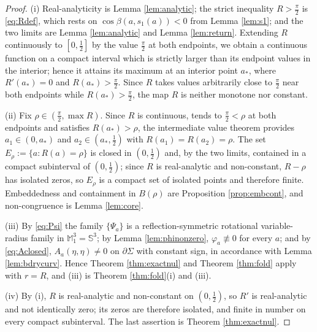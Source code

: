 \documentclass[11pt,a4paper]{amsart}
\theoremstyle{plain}
\theoremstyle{definition}
\newcommand{\M}{\mathbb{M}}
\newcommand{\Sph}{\mathbb{S}}
\begin{document}
\begin{proof}
(i) Real-analyticity is Lemma \ref{lem:analytic}; the strict inequality $R>\tfrac\pi2$ is \eqref{eq:Rdef}, which rests on $\cos\beta(a,s_1(a))<0$ from Lemma \ref{lem:s1}; and the two limits are Lemma \ref{lem:analytic} and Lemma \ref{lem:return}. Extending $R$ continuously to $[0,\tfrac12]$ by the value $\tfrac\pi2$ at both endpoints, we obtain a continuous function on a compact interval which is strictly larger than its endpoint values in the interior; hence it attains its maximum at an interior point $a_*$, where $R'(a_*)=0$ and $R(a_*)>\tfrac\pi2$. Since $R$ takes values arbitrarily close to $\tfrac\pi2$ near both endpoints while $R(a_*)>\tfrac\pi2$, the map $R$ is neither monotone nor constant.

(ii) Fix $\rho\in(\tfrac\pi2,\max R)$. Since $R$ is continuous, tends to $\tfrac\pi2<\rho$ at both endpoints and satisfies $R(a_*)>\rho$, the intermediate value theorem provides $a_1\in(0,a_*)$ and $a_2\in(a_*,\tfrac12)$ with $R(a_1)=R(a_2)=\rho$. The set $E_\rho:=\{a:R(a)=\rho\}$ is closed in $(0,\tfrac12)$ and, by the two limits, contained in a compact subinterval of $(0,\tfrac12)$; since $R$ is real-analytic and non-constant, $R-\rho$ has isolated zeros, so $E_\rho$ is a compact set of isolated points and therefore finite. Embeddedness and containment in $B(\rho)$ are Proposition \ref{prop:embcont}, and non-congruence is Lemma \ref{lem:core}.

(iii) By \eqref{eq:Psi} the family $\{\Psi_a\}$ is a reflection-symmetric rotational variable-radius family in $\M^3_1=\Sph^3$; by Lemma \ref{lem:phinonzero}, $\varphi_a\not\equiv 0$ for every $a$; and by \eqref{eq:Aclosed}, $A_a(\eta,\eta)\neq 0$ on $\partial\Sigma$ with constant sign, in accordance with Lemma \ref{lem:bdrycurv}. Hence Theorem \ref{thm:exactnul} and Theorem \ref{thm:fold} apply with $r=R$, and (iii) is Theorem \ref{thm:fold}(i) and (iii).

(iv) By (i), $R$ is real-analytic and non-constant on $(0,\tfrac12)$, so $R'$ is real-analytic and not identically zero; its zeros are therefore isolated, and finite in number on every compact subinterval. The last assertion is Theorem \ref{thm:exactnul}.
\end{proof}
\end{document}
